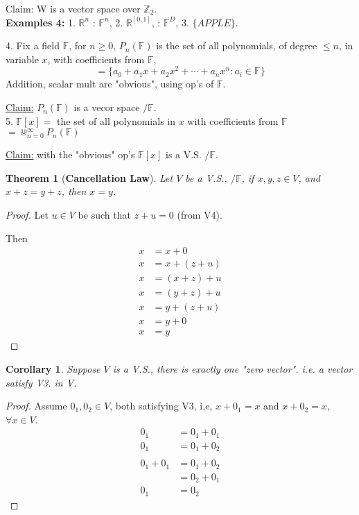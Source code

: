 \documentclass[12pt]{article}
\newtheorem{theorem}{Theorem}[subsection]
\newtheorem{corollary}{Corollary}[subsection]
\begin{document}
{	Claim: W is a vector space over $\mathbb{Z}_2$.\\

	\textbf{Examples 4: }
	1. $\mathbb{R}^n$ : $\mathbb{F}^n$, 
	2. $\mathbb{R}^{[0,1]}$, : $\mathbb{F}^D$, 
	3. $\{APPLE\}$.
	
	4. Fix a field $\mathbb{F}$, for $n\geq 0$, $P_n(\mathbb{F})$ is the set of 
	all polynomials, of degree $\leq n$, in variable $x$, with coefficients 
	from $\mathbb{F}$, 
	\[
		=\{a_0+a_1x+a_2x^2+\cdots+a_nx^n: a_i\in \mathbb{F}\}
	\]
	Addition, scalar mult are "obvious", using op's of $\mathbb{F}$. 
	
	\underline{Claim:} $P_n(\mathbb{F})$ is a vecor space $/\mathbb{F}$.\\

	5. $\mathbb{F}[x] = $ the set of all polynomials in $x$ with coefficients
	from $\mathbb{F}$ $=\Cup^{\infty}_{n=0} P_n(\mathbb{F})$

	\underline{Claim:} with the "obvious" op's $\mathbb{F}[x]$ is a V.S. 
	$/\mathbb{F}$. \\
	}
	
	\begin{theorem}[\textbf{Cancellation Law}]
		Let $V$ be a V.S., $/\mathbb{F}$, if $x, y, z\in V$, and $x+z=y+z$, 
		then $x=y$. 
	\end{theorem}
	\begin{proof}
		Let $u\in V$ be such that $z+u = 0$ (from V4). 
		
		Then \begin{align*}
			x	&= x + 0  \tag{V3}\\
			x	&= x + (z + u) \tag{Choice of u}\\
			x	&= (x + z) + u \tag{hypothesis}\\
			x	&= (y + z) + u \tag{V2}\\
			x	&= y + (z + u) \tag {V2}\\
			x	&= y + 0 \tag{choice of u}\\
			x	&= y
		\end{align*}
	\end{proof}

	\begin{corollary}
		Suppose $V$ is a V.S., there is exactly one "zero vector". i.e.
		a vector satisfy V3. in V.
	\end{corollary}
	\begin{proof}
		Assume $0_1, 0_2 \in V$, both satisfying V3, i,e, $x+0_1 = x$ and 
		$x+0_2 = x$, $\forall x\in V$.
		\begin{align*}
			0_1 &= 0_1 + 0_1\\
			0_1 &= 0_1 + 0_2\\\\
			0_1+0_1 &=0_1+0_2\\
			 &=0_2+0_1 \tag{V1}\\
			0_1&=0_2 \tag{By Cancellation}
		\end{align*}
	\end{proof}
\end{document}
